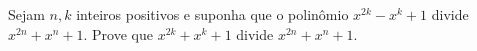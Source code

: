 Sejam \( n, k\) inteiros positivos e suponha que o polinômio \( x^{2k}-x^k+1\) divide \( x^{2n}+x^n+1\). Prove que \( x^{2k}+x^k+1\) divide \( x^{2n}+x^n+1\).

